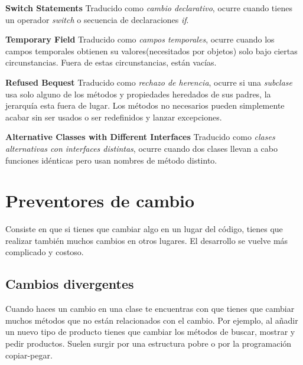 \documentclass[11pt,a4paper,oneside]{book}
\begin{document}
    \textbf{Switch Statements} \newline
    Traducido como \textit{cambio declarativo}, ocurre cuando tienes un operador \textit{switch} o secuencia de declaraciones \textit{if}.
    \newline
    
    \textbf{Temporary Field}  \newline
    Traducido como \textit{campos temporales}, ocurre cuando los campos temporales obtienen su valores(necesitados por objetos) solo bajo ciertas circunstancias. Fuera de estas circunstancias, están vacías.
    \newline
    
    \textbf{Refused Bequest}  \newline
    Traducido como \textit{rechazo de herencia}, ocurre si una \textit{subclase} usa solo alguno de los métodos y propiedades heredados de sus padres, la jerarquía esta fuera de lugar. Los métodos no necesarios pueden simplemente acabar sin ser usados o ser redefinidos y lanzar excepciones.
    \newline
    
    \textbf{Alternative Classes with Different Interfaces}  \newline
    Traducido como \textit{clases alternativas con interfaces distintas}, ocurre cuando dos clases llevan a cabo funciones idénticas pero usan nombres de método distinto.
    \newline



\section{Preventores de cambio}

Consiste en que si tienes que cambiar algo en un lugar del código, tienes que realizar también muchos cambios en otros lugares. El desarrollo se vuelve más complicado y costoso.

\subsection{Cambios divergentes}

Cuando haces un cambio en una clase te encuentras con que tienes que cambiar muchos métodos que no están relacionados con el cambio. Por ejemplo, al añadir un nuevo tipo de producto tienes que cambiar los métodos de buscar, mostrar y pedir productos.
\newline
Suelen surgir por una estructura pobre o por la programación copiar-pegar.
\end{document}
